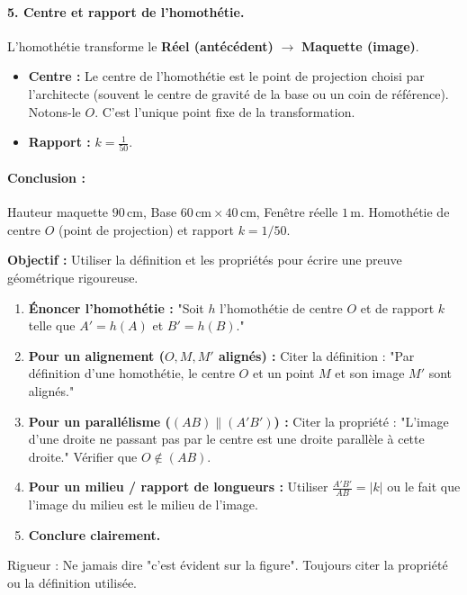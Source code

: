 \documentclass[11pt]{article}
\newcommand{\cle}[1]{{\popxbold\color{popdark}#1}}
\begin{document}
\begin{exoresolu}
\paragraph{5. Centre et rapport de l'homothétie.}
L'homothétie transforme le \textbf{Réel (antécédent)} $\to$ \textbf{Maquette (image)}.
\begin{itemize}
    \item \textbf{Centre :} Le centre de l'homothétie est le point de projection choisi par l'architecte (souvent le centre de gravité de la base ou un coin de référence). Notons-le $O$. C'est l'unique point fixe de la transformation.
    \item \textbf{Rapport :} $k = \frac{1}{50}$.
\end{itemize}
\paragraph{Conclusion :} Hauteur maquette $90\,\text{cm}$, Base $60\,\text{cm} \times 40\,\text{cm}$, Fenêtre réelle $1\,\text{m}$. Homothétie de centre $O$ (point de projection) et rapport $k=1/50$.
\end{exoresolu}

\begin{methode}
\textbf{Objectif :} Utiliser la définition et les propriétés pour écrire une preuve géométrique rigoureuse.
\begin{enumerate}
    \item \textbf{Énoncer l'homothétie :} "Soit $h$ l'homothétie de centre $O$ et de rapport $k$ telle que $A' = h(A)$ et $B' = h(B)$."
    \item \textbf{Pour un alignement ($O, M, M'$ alignés) :} Citer la définition : "Par définition d'une homothétie, le centre $O$ et un point $M$ et son image $M'$ sont alignés."
    \item \textbf{Pour un parallélisme ($(AB) \parallel (A'B')$) :} Citer la propriété : "L'image d'une droite ne passant pas par le centre est une droite parallèle à cette droite." Vérifier que $O \notin (AB)$.
    \item \textbf{Pour un milieu / rapport de longueurs :} Utiliser $\frac{A'B'}{AB} = |k|$ ou le fait que l'image du milieu est le milieu de l'image.
    \item \textbf{Conclure clairement.}
\end{enumerate}
\cle{Rigueur} : Ne jamais dire "c'est évident sur la figure". Toujours citer la propriété ou la définition utilisée.
\end{methode}
\end{document}
